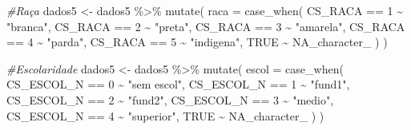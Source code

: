 \documentclass[
]{article}
\newenvironment{Shaded}{\begin{snugshade}}{\end{snugshade}}
\newcommand{\AttributeTok}[1]{\textcolor[rgb]{0.77,0.63,0.00}{#1}}
\newcommand{\CommentTok}[1]{\textcolor[rgb]{0.56,0.35,0.01}{\textit{#1}}}
\newcommand{\ConstantTok}[1]{\textcolor[rgb]{0.00,0.00,0.00}{#1}}
\newcommand{\DecValTok}[1]{\textcolor[rgb]{0.00,0.00,0.81}{#1}}
\newcommand{\FunctionTok}[1]{\textcolor[rgb]{0.00,0.00,0.00}{#1}}
\newcommand{\NormalTok}[1]{#1}
\newcommand{\OtherTok}[1]{\textcolor[rgb]{0.56,0.35,0.01}{#1}}
\newcommand{\SpecialCharTok}[1]{\textcolor[rgb]{0.00,0.00,0.00}{#1}}
\newcommand{\StringTok}[1]{\textcolor[rgb]{0.31,0.60,0.02}{#1}}
\begin{document}
\begin{Shaded}
\begin{Highlighting}[]
\CommentTok{\#Raça}
\NormalTok{dados5 }\OtherTok{\textless{}{-}}\NormalTok{  dados5 }\SpecialCharTok{\%\textgreater{}\%}
  \FunctionTok{mutate}\NormalTok{(}
    \AttributeTok{raca =} \FunctionTok{case\_when}\NormalTok{(}
\NormalTok{      CS\_RACA }\SpecialCharTok{==} \DecValTok{1} \SpecialCharTok{\textasciitilde{}} \StringTok{"branca"}\NormalTok{,}
\NormalTok{      CS\_RACA }\SpecialCharTok{==} \DecValTok{2} \SpecialCharTok{\textasciitilde{}} \StringTok{"preta"}\NormalTok{,}
\NormalTok{      CS\_RACA }\SpecialCharTok{==} \DecValTok{3} \SpecialCharTok{\textasciitilde{}} \StringTok{"amarela"}\NormalTok{,}
\NormalTok{      CS\_RACA }\SpecialCharTok{==} \DecValTok{4} \SpecialCharTok{\textasciitilde{}} \StringTok{"parda"}\NormalTok{,}
\NormalTok{      CS\_RACA }\SpecialCharTok{==} \DecValTok{5} \SpecialCharTok{\textasciitilde{}} \StringTok{"indigena"}\NormalTok{,}
      \ConstantTok{TRUE} \SpecialCharTok{\textasciitilde{}} \ConstantTok{NA\_character\_}
\NormalTok{    )}
\NormalTok{  )}

\CommentTok{\#Escolaridade}
\NormalTok{dados5 }\OtherTok{\textless{}{-}}\NormalTok{  dados5 }\SpecialCharTok{\%\textgreater{}\%}
  \FunctionTok{mutate}\NormalTok{(}
    \AttributeTok{escol =} \FunctionTok{case\_when}\NormalTok{(}
\NormalTok{      CS\_ESCOL\_N }\SpecialCharTok{==} \DecValTok{0} \SpecialCharTok{\textasciitilde{}} \StringTok{"sem escol"}\NormalTok{,}
\NormalTok{      CS\_ESCOL\_N }\SpecialCharTok{==} \DecValTok{1} \SpecialCharTok{\textasciitilde{}} \StringTok{"fund1"}\NormalTok{,}
\NormalTok{      CS\_ESCOL\_N }\SpecialCharTok{==} \DecValTok{2} \SpecialCharTok{\textasciitilde{}} \StringTok{"fund2"}\NormalTok{,}
\NormalTok{      CS\_ESCOL\_N }\SpecialCharTok{==} \DecValTok{3} \SpecialCharTok{\textasciitilde{}} \StringTok{"medio"}\NormalTok{,}
\NormalTok{      CS\_ESCOL\_N }\SpecialCharTok{==} \DecValTok{4} \SpecialCharTok{\textasciitilde{}} \StringTok{"superior"}\NormalTok{,}
      \ConstantTok{TRUE} \SpecialCharTok{\textasciitilde{}} \ConstantTok{NA\_character\_}
\NormalTok{    )}
\NormalTok{  )}


\end{Highlighting}
\end{Shaded}
\end{document}

